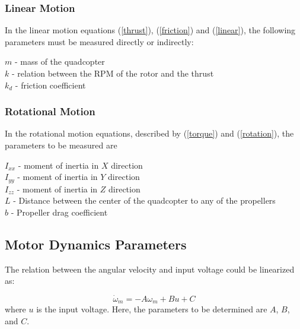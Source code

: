 \documentclass{article}
\begin{document}
\subsubsection{Linear Motion}
In the linear motion equations (\ref{thrust}), (\ref{friction}) and (\ref{linear}), the following parameters must be measured directly or indirectly:

\begin{center}
$m$ - mass of the quadcopter\\
$k$ - relation between the RPM of the rotor and the thrust\\
$k_d$ - friction coefficient
\end{center}

\subsubsection{Rotational Motion}
 
In the rotational motion equations, described by (\ref{torque}) and (\ref{rotation}), the parameters to be measured are 
\begin{center}
$I_{xx}$ - moment of inertia in $X$ direction\\
$I_{yy}$ - moment of inertia in $Y$ direction\\
$I_{zz}$ - moment of inertia in $Z$ direction\\
$L$ - Distance between the center of the quadcopter to any of the propellers\\
$b$ - Propeller drag coefficient
\end{center}

\subsection{Motor Dynamics Parameters}
The relation between the angular velocity and input voltage could be linearized as:

\begin{equation}
\dot{\omega}_m=-A\omega_m+Bu+C
\end{equation}
where $u$ is the input voltage. 
Here, the parameters to be determined are $A$, $B$, and $C$.
\end{document}
